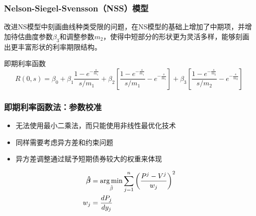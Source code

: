 \documentclass[11pt]{article}
\begin{document}
\subsubsection*{Nelson-Siegel-Svensson（NSS）模型}

改进NS模型中刻画曲线种类受限的问题，在NS模型的基础上增加了中期项，并增加待估曲度参数$\beta_3$和调整参数$m_2$，使得中短部分的形状更为灵活多样，能够刻画出更丰富形状的利率期限结构。

即期利率函数
\begin{equation*}
    R(0,s) = \beta_0 + \beta_1 \frac{1-e^{-\frac{s}{m_1}}}{s/m_1} + 
    \beta_2\left[\frac{1-e^{-\frac{s}{m_1}}}{s/m_1} - e^{-\frac{s}{m_1}}\right] +
    \beta_3\left[\frac{1-e^{-\frac{s}{m_2}}}{s/m_2} - e^{-\frac{s}{m_2}} \right]
\end{equation*}

\subsubsection*{即期利率函数法：参数校准}

\begin{itemize}
    \item 无法使用最小二乘法，而只能使用非线性最优化技术
    \item 同样需要考虑异方差和约束问题
    \item 异方差调整通过赋予短期债券较大的权重来体现
\end{itemize}

\begin{align*}
    \bm{\hat{\beta}} &= \operatorname*{arg\,min}_{\hat{\beta}} \sum^n_{j=1}\left(\frac{P^j - V^j}{w_j}\right)^2 \\
    w_j &= \frac{dP_j}{dy_j}
\end{align*}
\end{document}
